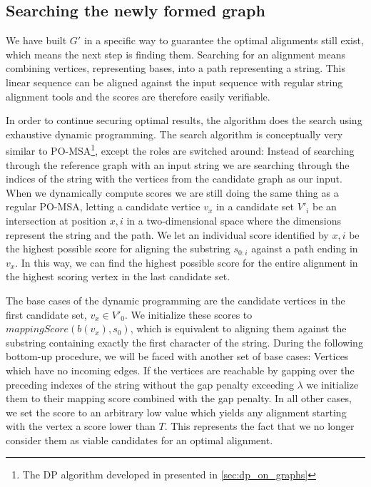 \documentclass[thesis.tex]{subfiles}
\begin{document}
\subsection{Searching the newly formed graph}
We have built $G'$ in a specific way to guarantee the optimal alignments still exist, which means the next step is finding them. Searching for an alignment means combining vertices, representing bases, into a path representing a string. This linear sequence can be aligned against the input sequence with regular string alignment tools and the scores are therefore easily verifiable.\\
\par\noindent
In order to continue securing optimal results, the algorithm does the search using exhaustive dynamic programming. The search algorithm is conceptually very similar to PO-MSA\footnote{The DP algorithm developed in \cite{multiple_sequence_alignment_using_partial_order_graphs} presented in \ref{sec:dp_on_graphs}}, except the roles are switched around: Instead of searching through the reference graph with an input string we are searching through the indices of the string with the vertices from the candidate graph as our input. When we dynamically compute scores we are still doing the same thing as a regular PO-MSA, letting a candidate vertice $v_x$ in a candidate set $V'_i$ be an intersection at position $x, i$ in a two-dimensional space where the dimensions represent the string and the path. We let an individual score identified by $x, i$ be the highest possible score for aligning the substring $s_{0:i}$ against a path ending in $v_x$. In this way, we can find the highest possible score for the entire alignment in the highest scoring vertex in the last candidate set.\\
\par\noindent
The base cases of the dynamic programming are the candidate vertices in the first candidate set, $v_x \in V'_0$. We initialize these scores to $mappingScore(b(v_x), s_0)$, which is equivalent to aligning them against the substring containing exactly the first character of the string. During the following bottom-up procedure, we will be faced with another set of base cases: Vertices which have no incoming edges. If the vertices are reachable by gapping over the preceding indexes of the string without the gap penalty exceeding $\lambda$ we initialize them to their mapping score combined with the gap penalty. In all other cases, we set the score to an arbitrary low value which yields any alignment starting with the vertex a score lower than $T$. This represents the fact that we no longer consider them as viable candidates for an optimal alignment.\\
\end{document}
